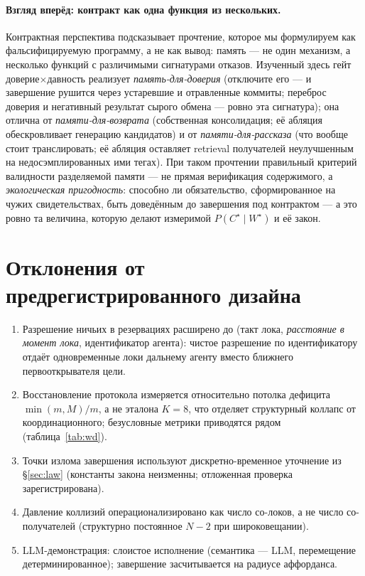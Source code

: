\documentclass{article}
\newcommand{\wstar}{W^{\star}}
\newcommand{\cstar}{C^{\star}}
\begin{document}
\paragraph{Взгляд вперёд: контракт как одна функция из нескольких.}
Контрактная перспектива подсказывает прочтение, которое мы формулируем
как фальсифицируемую программу, а не как вывод: память --- не один
механизм, а несколько функций с различимыми сигнатурами отказов.
Изученный здесь гейт доверие$\times$давность реализует
\emph{память-для-доверия} (отключите его --- и завершение рушится
через устаревшие и отравленные коммиты; переброс доверия и негативный
результат сырого обмена --- ровно эта сигнатура); она отлична от
\emph{памяти-для-возврата} (собственная консолидация; её абляция
обескровливает генерацию кандидатов) и от \emph{памяти-для-рассказа}
(что вообще стоит транслировать; её абляция оставляет retrieval
получателей неулучшенным на недосэмплированных ими тегах). При таком
прочтении правильный критерий валидности разделяемой памяти --- не
прямая верификация содержимого, а \emph{экологическая пригодность}:
способно ли обязательство, сформированное на чужих свидетельствах,
быть доведённым до завершения под контрактом --- а это ровно та
величина, которую делают измеримой $P(\cstar \mid \wstar)$ и её закон.

\appendix

\section{Отклонения от предрегистрированного дизайна}
\label{app:deviations}
\begin{enumerate}[leftmargin=20pt,itemsep=2pt,topsep=2pt]
\item Разрешение ничьих в резервациях расширено до (такт лока,
  \emph{расстояние в момент лока}, идентификатор агента): чистое
  разрешение по идентификатору отдаёт одновременные локи дальнему
  агенту вместо ближнего первооткрывателя цели.
\item Восстановление протокола измеряется относительно потолка
  дефицита $\min(m,M)/m$, а не эталона $K{=}8$, что отделяет
  структурный коллапс от координационного; безусловные метрики
  приводятся рядом (таблица~\ref{tab:wd}).
\item Точки излома завершения используют дискретно-временное
  уточнение из \S\ref{sec:law} (константы закона неизменны;
  отложенная проверка зарегистрирована).
\item Давление коллизий операционализировано как число со-локов, а не
  число со-получателей (структурно постоянное $N{-}2$ при
  широковещании).
\item LLM-демонстрация: слоистое исполнение (семантика --- LLM,
  перемещение детерминированное); завершение засчитывается на радиусе
  аффорданса.
\end{enumerate}
\end{document}
